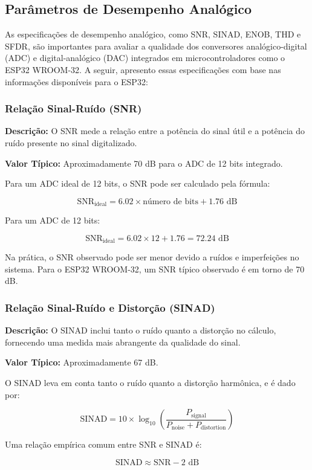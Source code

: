 \subsection{Parâmetros de Desempenho Analógico}

As especificações de desempenho analógico, como SNR, SINAD, ENOB, THD e SFDR, são importantes para avaliar a qualidade dos conversores analógico-digital (ADC) e digital-analógico (DAC) integrados em microcontroladores como o ESP32 WROOM-32. A seguir, apresento essas especificações com base nas informações disponíveis para o ESP32:

\subsubsection*{Relação Sinal-Ruído (SNR)}
\textbf{Descrição:} O SNR mede a relação entre a potência do sinal útil e a potência do ruído presente no sinal digitalizado.

\textbf{Valor Típico:} Aproximadamente 70 dB para o ADC de 12 bits integrado.

Para um ADC ideal de 12 bits, o SNR pode ser calculado pela fórmula:

\[
\text{SNR}_{\text{ideal}} = 6.02 \times \text{número de bits} + 1.76 \text{ dB}
\]

Para um ADC de 12 bits:

\[
\text{SNR}_{\text{ideal}} = 6.02 \times 12 + 1.76 = 72.24 \text{ dB}
\]

Na prática, o SNR observado pode ser menor devido a ruídos e imperfeições no sistema. Para o ESP32 WROOM-32, um SNR típico observado é em torno de 70 dB.

\subsubsection{Relação Sinal-Ruído e Distorção (SINAD)}
\textbf{Descrição:} O SINAD inclui tanto o ruído quanto a distorção no cálculo, fornecendo uma medida mais abrangente da qualidade do sinal.

\textbf{Valor Típico:} Aproximadamente 67 dB.

O SINAD leva em conta tanto o ruído quanto a distorção harmônica, e é dado por:

\[
\text{SINAD} = 10 \times \log_{10}\left(\frac{P_{\text{signal}}}{P_{\text{noise}} + P_{\text{distortion}}}\right)
\]

Uma relação empírica comum entre SNR e SINAD é:

\[
\text{SINAD} \approx \text{SNR} - 2 \text{ dB}
\]

